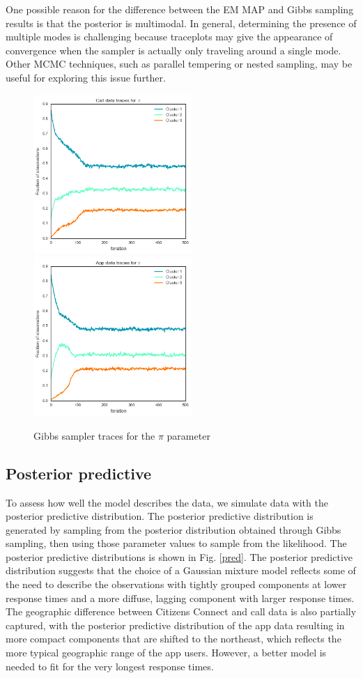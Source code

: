\documentclass[twoside]{article}
\theoremstyle{theorem}
\theoremstyle{theorem}
\theoremstyle{theorem}
\theoremstyle{lemma}
\theoremstyle{definition}
\theoremstyle{example}
\begin{document}
One possible reason for the difference between the EM MAP and Gibbs sampling results is that the posterior is multimodal. In general, determining the presence of multiple modes is challenging because traceplots may give the appearance of convergence when the sampler is actually only traveling around a single mode. Other MCMC techniques, such as parallel tempering or nested sampling, may be useful for exploring this issue further. 

\begin{figure}[h!]
\begin{center}
\includegraphics[width=60mm]{calldatapitrace}
\includegraphics[width=60mm]{appdatapitrace}
\caption{Gibbs sampler traces for the $\pi$ parameter}
\label{trace}
\end{center}
\end{figure}

\subsection{Posterior predictive}
To assess how well the model describes the data, we simulate data with the posterior predictive distribution. The posterior predictive distribution is generated by sampling from the posterior distribution obtained through Gibbs sampling, then using those parameter values to sample from the likelihood. The posterior predictive distributions is shown in Fig. \ref{pred}. The posterior predictive distribution suggests that the choice of a Gaussian mixture model reflects some of the need to describe the observations with tightly grouped components at lower response times and a more diffuse, lagging component with larger response times. The geographic difference between Citizens Connect and call data is also partially captured, with the posterior predictive distribution of the app data resulting in more compact components that are shifted to the northeast, which reflects the more typical geographic range of the app users.  However, a better model is needed to fit for the very longest response times. 
\end{document}
